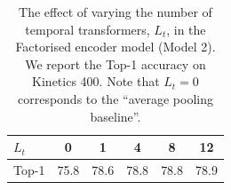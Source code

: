 \begin{table}[tb]
	\centering
	\caption{The effect of varying the number of temporal transformers, $L_t$, in the Factorised encoder model (Model 2).
		We report the Top-1 accuracy on Kinetics 400.
		Note that $L_t = 0$ corresponds to the ``average pooling baseline''.
	}
	\begin{tabular}{lccccc}
	\toprule
	 $L_t$    			& 0 & 1 & 4 & 8 & 12 \\ \midrule
	 Top-1		& 75.8  & 78.6   & 78.8  & 78.8  & 78.9   \\ \bottomrule
	\end{tabular}
	\label{tab:ablation_temporal_transformers}
	\vspace{-\baselineskip}
\end{table}